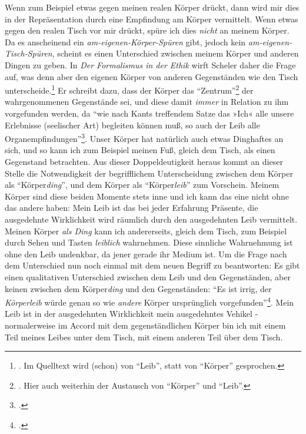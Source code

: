 \documentclass[a4paper, 12pt]{article}
\begin{document}
\begin{onehalfspace}
Wenn zum Beispiel etwas gegen meinen realen Körper drückt, dann wird mir dies in der Repräsentation durch eine Empfindung am Körper vermittelt. Wenn etwas gegen den realen Tisch vor mir drückt, spüre ich dies \emph{nicht} an meinem Körper. Da es anscheinend ein \emph{am-eigenen-Körper-Spüren} gibt, jedoch kein \emph{am-eigenen-Tisch-Spüren}, scheint es einen Unterschied zwischen meinem Körper und anderen Dingen zu geben. In \emph{Der Formalismus in der Ethik} wirft Scheler daher die Frage auf, was denn aber den eigenen Körper von anderen Gegenständen wie den Tisch unterscheide.\footnote{\Cite[Vgl.][S. 498]{scheler-ethik}. Im Quelltext wird (schon) von "`Leib"', statt von "`Körper"' gesprochen.} Er schreibt dazu, dass der Körper das "`Zentrum"'\footnote{\Cite[Vgl.][S. 498]{scheler-ethik}. Hier auch weiterhin der Austausch von "`Körper"' und "`Leib"'.} der wahrgenommenen Gegenstände sei, und diese damit \emph{immer} in Relation zu ihm vorgefunden werden, da "`wie nach Kants treffendem Satze das »Ich« alle unsere Erlebnisse (seelischer Art) begleiten können muß, so auch der Leib alle Organempfindungen"'\footnote{\Cite[Siehe][S. 495]{scheler-ethik}.}. Unser Körper hat natürlich auch etwas Dinghaftes an sich, und so kann ich zum Beispiel meinen Fuß, gleich dem Tisch, als einen Gegenstand betrachten. Aus dieser Doppeldeutigkeit heraus kommt an dieser Stelle die Notwendigkeit der begrifflichem Unterscheidung zwischen dem Körper als "`Körper\emph{ding}"', und dem Körper als "`Körper\emph{leib}"' zum Vorschein. Meinem Körper sind diese beiden Momente stets inne und ich kann das eine nicht ohne das andere haben: Mein Leib ist das bei jeder Erfahrung Präsente, die ausgedehnte Wirklichkeit wird räumlich durch den ausgedehnten Leib vermittelt. Meinen Körper \emph{als Ding} kann ich andererseits, gleich dem Tisch, zum Beispiel durch Sehen und Tasten \emph{leiblich} wahrnehmen. Diese sinnliche Wahrnehmung ist ohne den Leib undenkbar, da jener gerade ihr Medium ist. Um die Frage nach dem Unterschied nun noch einmal mit dem neuen Begriff zu beantworten: Es gibt einen qualitativen Unterschied zwischen dem Leib und den Gegenständen, aber keinen zwischen dem Körper\emph{ding} und den Gegenständen: "`Es ist irrig, der \emph{Körperleib} würde genau so wie \emph{andere} Körper ursprünglich vorgefunden"'\footnote{\Cite[Siehe][S. 494]{scheler-ethik}.}. Mein Leib ist in der ausgedehnten Wirklichkeit mein ausgedehntes Vehikel - normalerweise im Accord mit dem gegenständlichen Körper bin ich mit einem Teil meines Leibes unter dem Tisch, mit einem anderen Teil über dem Tisch. 


\end{onehalfspace}
\end{document}

